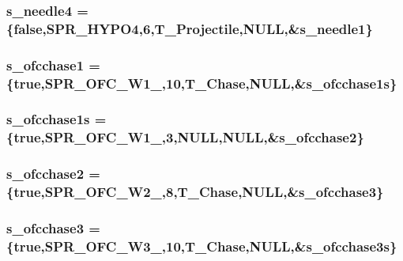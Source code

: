 \label{WL__ACT2_8C_a91077e051a1c5b8bdcd3a13bd34bf412}
\hypertarget{WL__ACT2_8C_a18e9f19ac3118dad31a26cc1bc958c6a}{
\subsubsection[{s\_\-needle4}]{ {\bf s\_\-needle4} = \{false,SPR\_\-HYPO4,6,T\_\-Projectile,NULL,\&{\bf s\_\-needle1}\}}}
\label{WL__ACT2_8C_a18e9f19ac3118dad31a26cc1bc958c6a}
\hypertarget{WL__ACT2_8C_a44b7e077d3373fd8075bb6acdcfcd0df}{
\subsubsection[{s\_\-ofcchase1}]{ {\bf s\_\-ofcchase1} = \{true,SPR\_\-OFC\_\-W1\_,10,T\_\-Chase,NULL,\&{\bf s\_\-ofcchase1s}\}}}
\label{WL__ACT2_8C_a44b7e077d3373fd8075bb6acdcfcd0df}
\hypertarget{WL__ACT2_8C_ae5c4dde8c0f8355a55c9a8bdc9665729}{
\subsubsection[{s\_\-ofcchase1s}]{ {\bf s\_\-ofcchase1s} = \{true,SPR\_\-OFC\_\-W1\_,3,NULL,NULL,\&{\bf s\_\-ofcchase2}\}}}
\label{WL__ACT2_8C_ae5c4dde8c0f8355a55c9a8bdc9665729}
\hypertarget{WL__ACT2_8C_a82471cb0d5e2a8a976b5c7e23c3f9b7c}{
\subsubsection[{s\_\-ofcchase2}]{ {\bf s\_\-ofcchase2} = \{true,SPR\_\-OFC\_\-W2\_,8,T\_\-Chase,NULL,\&{\bf s\_\-ofcchase3}\}}}
\label{WL__ACT2_8C_a82471cb0d5e2a8a976b5c7e23c3f9b7c}
\hypertarget{WL__ACT2_8C_a24320ed1eb7529458e729fe7520820ba}{
\subsubsection[{s\_\-ofcchase3}]{ {\bf s\_\-ofcchase3} = \{true,SPR\_\-OFC\_\-W3\_,10,T\_\-Chase,NULL,\&{\bf s\_\-ofcchase3s}\}}}
